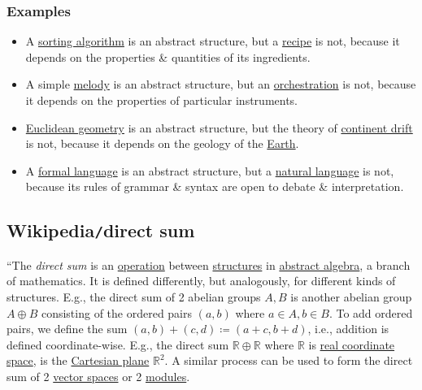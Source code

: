 \documentclass{article}
\begin{document}
\subsubsection{Examples}

\begin{itemize}
	\item A \href{https://en.wikipedia.org/wiki/Sorting_algorithm}{sorting algorithm} is an abstract structure, but a \href{https://en.wikipedia.org/wiki/Recipe}{recipe} is not, because it depends on the properties \& quantities of its ingredients.
	\item A simple \href{https://en.wikipedia.org/wiki/Melody}{melody} is an abstract structure, but an \href{https://en.wikipedia.org/wiki/Orchestration}{orchestration} is not, because it depends on the properties of particular instruments.
	\item \href{https://en.wikipedia.org/wiki/Euclidean_geometry}{Euclidean geometry} is an abstract structure, but the theory of \href{https://en.wikipedia.org/wiki/Continental_drift}{continent drift} is not, because it depends on the geology of the \href{https://en.wikipedia.org/wiki/Earth}{Earth}.
	\item A \href{https://en.wikipedia.org/wiki/Formal_language}{formal language} is an abstract structure, but a \href{https://en.wikipedia.org/wiki/Natural_language}{natural language} is not, because its rules of grammar \& syntax are open to debate \& interpretation.
\end{itemize}

\subsection{Wikipedia{\tt/}direct sum}
``The {\it direct sum} is an \href{https://en.wikipedia.org/wiki/Operation_(mathematics)}{operation} between \href{https://en.wikipedia.org/wiki/Mathematical_structure}{structures} in \href{https://en.wikipedia.org/wiki/Abstract_algebra}{abstract algebra}, a branch of mathematics. It is defined differently, but analogously, for different kinds of structures. E.g., the direct sum of 2 abelian groups $A,B$ is another abelian group $A\oplus B$ consisting of the ordered pairs $(a,b)$ where $a\in A,b\in B$. To add ordered pairs, we define the sum $(a,b) + (c,d)\coloneqq(a + c,b + d)$, i.e., addition is defined coordinate-wise. E.g., the direct sum $\mathbb{R}\oplus\mathbb{R}$ where $\mathbb{R}$ is \href{https://en.wikipedia.org/wiki/Real_coordinate_space}{real coordinate space}, is the \href{https://en.wikipedia.org/wiki/Cartesian_plane}{Cartesian plane} $\mathbb{R}^2$. A similar process can be used to form the direct sum of 2 \href{https://en.wikipedia.org/wiki/Vector_space}{vector spaces} or 2 \href{https://en.wikipedia.org/wiki/Module_(mathematics)}{modules}.
\end{document}

